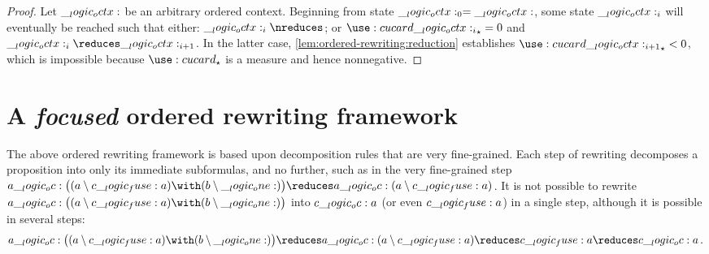 %
\begin{proof}
  Let $\__logic_octx:$ be an arbitrary ordered context.
  Beginning from state $\__logic_octx:_0 = \__logic_octx:$, some state $\__logic_octx:_i$ will eventually be reached such that either: $\octx_i \nreduces$; or $\card{\octx_i}_{\star} = 0$ and $\octx_i \reduces \octx_{i+1}$.
  In the latter case, \cref{lem:ordered-rewriting:reduction} establishes $\card{\octx_{i+1}}_{\star} < 0$, which is impossible because $\card{}_{\star}$ is a measure and hence nonnegative.
\end{proof}




\section{A \emph{focused} ordered rewriting framework}\label{sec:ordered-rewriting:focused}

The above ordered rewriting framework is based upon decomposition rules that are very fine-grained.
Each step of rewriting decomposes a proposition into only its immediate subformulas, and no further, such as in the very fine-grained step $a \oc \bigl((a \limp c \fuse a) \with (b \limp \one)\bigr) \reduces a \oc (a \limp c \fuse a)$.
It is not possible to rewrite $a \oc \bigl((a \limp c \fuse a) \with (b \limp \one)\bigr)$ into $c \__logic_oc: a$ (or even $c \__logic_fuse: a$) in a single step, although it is possible in several steps:%
\begin{equation*}
  a \oc \bigl((a \limp c \fuse a) \with (b \limp \one)\bigr) \reduces a \oc (a \limp c \fuse a) \reduces c \fuse a \reduces c \oc a
  \,.
\end{equation*}

